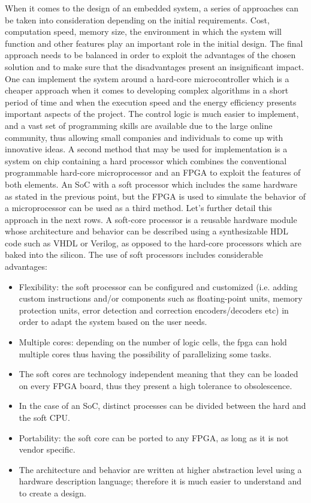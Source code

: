 \hspace{0.5cm} When it comes to the design of an embedded system, a series of approaches can be taken into
consideration depending on the initial requirements. Cost, computation speed, memory size,
the environment in which the system will function and other features play an important role
in the initial design. The final approach needs to be balanced in order to exploit the
advantages of the chosen solution and to make sure that the disadvantages present an
insignificant impact. One can implement the system around a hard-core microcontroller
which is a cheaper approach when it comes to developing complex algorithms in a short
period of time and when the execution speed and the energy efficiency presents important
aspects of the project. The control logic is much easier to implement, and a vast set of
programming skills are available due to the large online community, thus allowing small
companies and individuals to come up with innovative ideas. A second method that may be
used for implementation is a system on chip containing a hard processor which combines the
conventional programmable hard-core microprocessor and an FPGA to exploit the features of
both elements. An SoC with a soft processor which includes the same hardware as stated in
the previous point, but the FPGA is used to simulate the behavior of a microprocessor can be
used as a third method. Let’s further detail this approach in the next rows.
A soft-core processor is a reusable hardware module \cite{Kuznetsov2019} whose architecture and behavior can
be described using a synthesizable HDL code such as VHDL or Verilog, as opposed to the
hard-core processors which are baked into the silicon. The use of soft processors includes
considerable advantages:

\begin{itemize}
    \item Flexibility: the soft processor can be configured and customized (i.e. adding custom
instructions and/or components such as floating-point units, memory protection units,
error detection and correction encoders/decoders etc) in order to adapt the system
based on the user needs.
    \item Multiple cores: depending on the number of logic cells, the fpga can hold multiple
cores thus having the possibility of parallelizing some tasks.
    \item The soft cores are technology independent meaning that they can be loaded on every
FPGA board, thus they present a high tolerance to obsolescence.
    \item In the case of an SoC, distinct processes can be divided between the hard and the soft
CPU.
    \item Portability: the soft core can be ported to any FPGA, as long as it is not vendor
specific.
    \item The architecture and behavior are written at higher abstraction level using a hardware
description language; therefore it is much easier to understand and to create a design.
\end{itemize}

